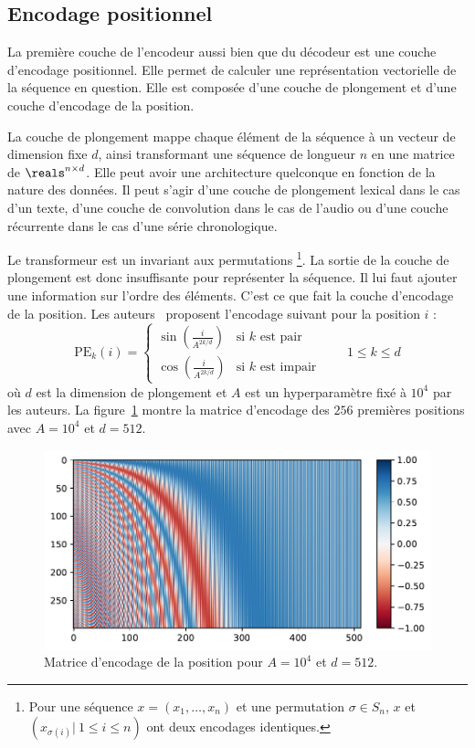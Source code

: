 \subsection{Encodage positionnel}

La première couche de l'encodeur aussi bien que du décodeur est une couche d'encodage positionnel.
Elle permet de calculer une représentation vectorielle de la séquence en question.
Elle est composée d'une couche de plongement et d'une couche d'encodage de la position.

La couche de plongement mappe chaque élément de la séquence à un vecteur de dimension fixe \(d\),
ainsi transformant une séquence de longueur \(n\) en une matrice de \(\reals^{n \times d}\).
Elle peut avoir une architecture quelconque en fonction de la nature des données.
Il peut s'agir d'une couche de plongement lexical dans le cas d'un texte, 
d'une couche de convolution dans le cas de l'audio 
ou d'une couche récurrente dans le cas d'une série chronologique.

Le transformeur est un invariant aux permutations%
\footnote{%
    Pour une séquence \(x = (x_1, \ldots, x_n)\) et une permutation \(\sigma\in S_n\),
    \(x\) et \(\left(x_{\sigma(i)}|\ 1 \le i \le n\right)\) ont deux encodages identiques.
}.
La sortie de la couche de plongement est donc insuffisante pour représenter la séquence.
Il lui faut ajouter une information sur l'ordre des éléments.
C'est ce que fait la couche d'encodage de la position.
Les auteurs~\cite{attention} proposent l'encodage suivant pour la position \(i\) :
\begin{equation}
    \label{eq.sine-positional-encoding}
    \mathrm{PE}_{k}(i) = 
    \begin{cases}
        \sin\left(\frac{i}{A^{2k/d}}\right) & \text{si } k \text{ est pair} \\
        \cos\left(\frac{i}{A^{2k/d}}\right) & \text{si } k \text{ est impair}
    \end{cases} \qquad 1 \le k \le d
\end{equation}
où \(d\) est la dimension de plongement et \(A\) est un hyperparamètre fixé à \(10^4\) par les auteurs.
La figure~\ref{fig.positional-encoding} montre la matrice d'encodage des \(256\) premières positions
avec \(A=10^4\) et \(d=512\).

\begin{figure}[htb]
    \centering
    \includegraphics[width=12cm]{assets/python/positional_embedding.pdf}
    \caption{Matrice d'encodage de la position pour \(A=10^4\) et \(d=512\).}
    \label{fig.positional-encoding}    
\end{figure}

